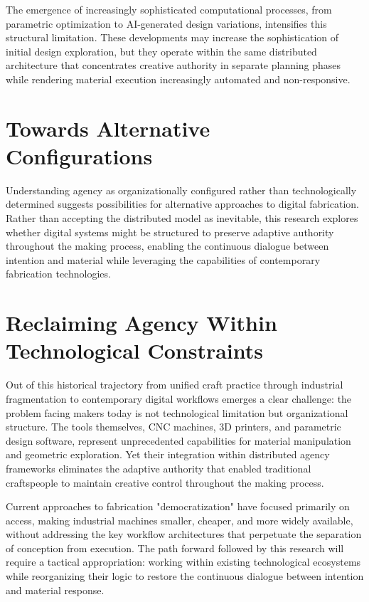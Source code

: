 The emergence of increasingly sophisticated computational processes, from parametric optimization to AI-generated design variations, intensifies this structural limitation. These developments may increase the sophistication of initial design exploration, but they operate within the same distributed architecture that concentrates creative authority in separate planning phases while rendering material execution increasingly automated and non-responsive.

\section{Towards Alternative Configurations}

Understanding agency as organizationally configured rather than technologically determined suggests possibilities for alternative approaches to digital fabrication. Rather than accepting the distributed model as inevitable, this research explores whether digital systems might be structured to preserve adaptive authority throughout the making process, enabling the continuous dialogue between intention and material while leveraging the capabilities of contemporary fabrication technologies.

\section{Reclaiming Agency Within Technological Constraints}

Out of this historical trajectory from unified craft practice through industrial fragmentation to contemporary digital workflows emerges a clear challenge: the problem facing makers today is not technological limitation but organizational structure. The tools themselves, CNC machines, 3D printers, and parametric design software, represent unprecedented capabilities for material manipulation and geometric exploration. Yet their integration within distributed agency frameworks eliminates the adaptive authority that enabled traditional craftspeople to maintain creative control throughout the making process.

Current approaches to fabrication "democratization" have focused primarily on access, making industrial machines smaller, cheaper, and more widely available, without addressing the key workflow architectures that perpetuate the separation of conception from execution. The path forward followed by this research will require a tactical appropriation: working within existing technological ecosystems while reorganizing their logic to restore the continuous dialogue between intention and material response.

